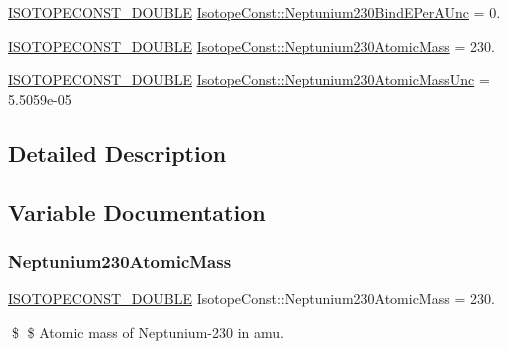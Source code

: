 \begin{DoxyCompactItemize}
\mbox{\hyperlink{group___isotope_const-_macros_ga8f45a7272ce02c0b4c65c44636ed719a}{I\+S\+O\+T\+O\+P\+E\+C\+O\+N\+S\+T\+\_\+\+D\+O\+U\+B\+LE}} \mbox{\hyperlink{group___isotope_const-_neptunium-_np230_ga0dc39eacb6a648bc885623933045957a}{Isotope\+Const\+::\+Neptunium230\+Bind\+E\+Per\+A\+Unc}} = 0.
\item 
\mbox{\hyperlink{group___isotope_const-_macros_ga8f45a7272ce02c0b4c65c44636ed719a}{I\+S\+O\+T\+O\+P\+E\+C\+O\+N\+S\+T\+\_\+\+D\+O\+U\+B\+LE}} \mbox{\hyperlink{group___isotope_const-_neptunium-_np230_gad99a12812a9481be05477ccdfeb82912}{Isotope\+Const\+::\+Neptunium230\+Atomic\+Mass}} = 230.
\item 
\mbox{\hyperlink{group___isotope_const-_macros_ga8f45a7272ce02c0b4c65c44636ed719a}{I\+S\+O\+T\+O\+P\+E\+C\+O\+N\+S\+T\+\_\+\+D\+O\+U\+B\+LE}} \mbox{\hyperlink{group___isotope_const-_neptunium-_np230_gad8497c2a697c26a4d13384fa54b648da}{Isotope\+Const\+::\+Neptunium230\+Atomic\+Mass\+Unc}} = 5.\+5059e-\/05
\end{DoxyCompactItemize}


\subsection{Detailed Description}


\subsection{Variable Documentation}
\mbox{\label{group___isotope_const-_neptunium-_np230_gad99a12812a9481be05477ccdfeb82912}} 
\subsubsection{\texorpdfstring{Neptunium230\+Atomic\+Mass}{Neptunium230AtomicMass}}
{\footnotesize\ttfamily \mbox{\hyperlink{group___isotope_const-_macros_ga8f45a7272ce02c0b4c65c44636ed719a}{I\+S\+O\+T\+O\+P\+E\+C\+O\+N\+S\+T\+\_\+\+D\+O\+U\+B\+LE}} Isotope\+Const\+::\+Neptunium230\+Atomic\+Mass = 230.}

\$ \$ Atomic mass of Neptunium-\/230 in amu. \mbox{\label{group___isotope_const-_neptunium-_np230_gad8497c2a697c26a4d13384fa54b648da}} 
